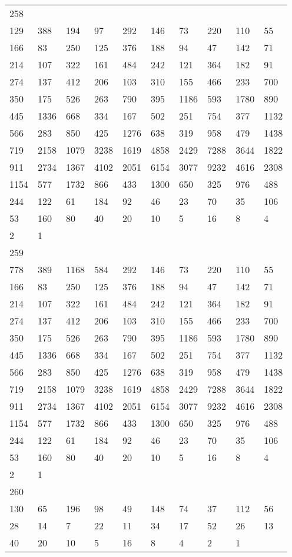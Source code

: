 \begin{longtable}{*{10}{l}}
258&&&&&&&&&\\
129& 388& 194& 97& 292& 146& 73& 220& 110& 55\\
166& 83& 250& 125& 376& 188& 94& 47& 142& 71\\
214& 107& 322& 161& 484& 242& 121& 364& 182& 91\\
274& 137& 412& 206& 103& 310& 155& 466& 233& 700\\
350& 175& 526& 263& 790& 395& 1186& 593& 1780& 890\\
445& 1336& 668& 334& 167& 502& 251& 754& 377& 1132\\
566& 283& 850& 425& 1276& 638& 319& 958& 479& 1438\\
719& 2158& 1079& 3238& 1619& 4858& 2429& 7288& 3644& 1822\\
911& 2734& 1367& 4102& 2051& 6154& 3077& 9232& 4616& 2308\\
1154& 577& 1732& 866& 433& 1300& 650& 325& 976& 488\\
244& 122& 61& 184& 92& 46& 23& 70& 35& 106\\
53& 160& 80& 40& 20& 10& 5& 16& 8& 4\\
2& 1& \\

259&&&&&&&&&\\
778& 389& 1168& 584& 292& 146& 73& 220& 110& 55\\
166& 83& 250& 125& 376& 188& 94& 47& 142& 71\\
214& 107& 322& 161& 484& 242& 121& 364& 182& 91\\
274& 137& 412& 206& 103& 310& 155& 466& 233& 700\\
350& 175& 526& 263& 790& 395& 1186& 593& 1780& 890\\
445& 1336& 668& 334& 167& 502& 251& 754& 377& 1132\\
566& 283& 850& 425& 1276& 638& 319& 958& 479& 1438\\
719& 2158& 1079& 3238& 1619& 4858& 2429& 7288& 3644& 1822\\
911& 2734& 1367& 4102& 2051& 6154& 3077& 9232& 4616& 2308\\
1154& 577& 1732& 866& 433& 1300& 650& 325& 976& 488\\
244& 122& 61& 184& 92& 46& 23& 70& 35& 106\\
53& 160& 80& 40& 20& 10& 5& 16& 8& 4\\
2& 1& \\

260&&&&&&&&&\\
130& 65& 196& 98& 49& 148& 74& 37& 112& 56\\
28& 14& 7& 22& 11& 34& 17& 52& 26& 13\\
40& 20& 10& 5& 16& 8& 4& 2& 1& \\


\end{longtable}
